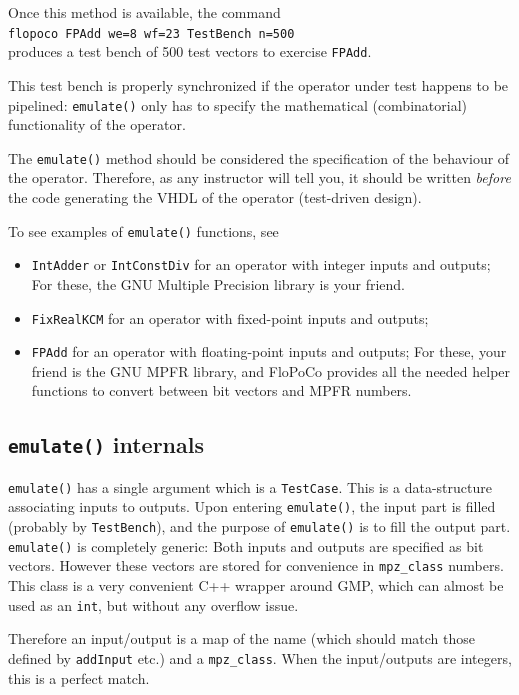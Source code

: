 \documentclass{article}
\begin{document}
Once this method is available, the command\\
 \texttt{flopoco FPAdd we=8 wf=23 TestBench n=500} \\
produces a test bench of 500 test vectors to exercise \texttt{\small FPAdd}. 

This test bench is properly synchronized if the operator under test happens to be pipelined: \texttt{\small emulate()} only has to specify the mathematical (combinatorial) functionality of the operator.

The \texttt{\small emulate()} method should be considered  the specification of the behaviour of the operator.
Therefore, as any instructor will tell you, it should be written \emph{before} the code generating the VHDL of the operator (test-driven design).


To see examples of \texttt{emulate()} functions, see
\begin{itemize}
\item \texttt{IntAdder} or \texttt{IntConstDiv} for an operator with integer inputs and outputs;
  For these, the GNU Multiple Precision library is your friend.
\item \texttt{FixRealKCM} for an operator with fixed-point inputs and outputs;
\item \texttt{FPAdd}  for an operator with floating-point inputs and outputs;
  For these, your friend is the GNU MPFR library, and FloPoCo provides all the needed helper functions to convert between bit vectors and MPFR numbers.
\end{itemize}


\subsection{\texttt{emulate()}  internals}
\texttt{\small emulate()} has a single argument which is a \texttt{\small TestCase}.
This is a data-structure associating inputs to outputs.
Upon entering \texttt{\small emulate()}, the input part is filled (probably by \texttt{\small TestBench}), and the purpose of \texttt{\small emulate()} is to fill the output part.
\texttt{\small emulate()} is completely generic:
Both inputs and outputs are specified as bit vectors.
However these vectors are stored for convenience in \texttt{\small mpz\_class} numbers.
This class is a very convenient C++ wrapper around GMP, which can almost be used as an \texttt{\small int}, but without any overflow issue.

Therefore an input/output is a map of the name (which should match those defined by \texttt{\small addInput} etc.) and a \texttt{\small mpz\_class}.
When the input/outputs are integers, this is a perfect match.
\end{document}
